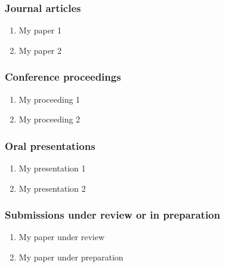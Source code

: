 \subsubsection*{Journal articles}
\begin{enumerate}
    \item My paper 1
    \item My paper 2
\end{enumerate}

\subsubsection*{Conference proceedings}
\begin{enumerate}
    \item My proceeding 1
    \item My proceeding 2
\end{enumerate}

\subsubsection*{Oral presentations}
\begin{enumerate}
    \item My presentation 1
    \item My presentation 2
\end{enumerate}

\subsubsection*{Submissions under review or in preparation}
\begin{enumerate}
    \item My paper under review
    \item My paper under preparation
\end{enumerate}